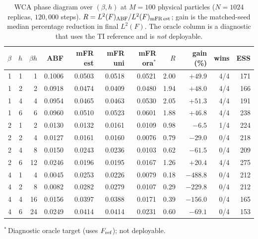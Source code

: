 \begin{table}[t]
\centering
\small
\caption{WCA phase diagram over $(\beta,h)$ at $M=100$ physical particles
($N=1024$ replicas, $120{,}000$ steps).
$R=L^2(F)_{\rm ABF}/L^2(F)_{\rm mFR\,est}$; gain is the matched-seed median
percentage reduction in final $L^2(F)$. The oracle column is a diagnostic that
uses the TI reference and is \emph{not} deployable.}
\label{tab:wca_phase_main}
\begin{tabular}{rrr rrrr rr rr}
\toprule
$\beta$ & $h$ & $\beta h$ & ABF & mFR est & mFR uni & mFR ora$^{*}$ & $R$ & gain (\%) & wins & ESS \\
\midrule
1 & 1 & 1 & 0.1006 & 0.0503 & 0.0518 & 0.0521 & 2.00 & $+49.9$ & 4/4 & 171 \\
1 & 2 & 2 & 0.0918 & 0.0474 & 0.0409 & 0.0480 & 1.94 & $+48.0$ & 4/4 & 166 \\
1 & 4 & 4 & 0.0954 & 0.0465 & 0.0463 & 0.0530 & 2.05 & $+51.3$ & 4/4 & 191 \\
1 & 6 & 6 & 0.0960 & 0.0510 & 0.0523 & 0.0601 & 1.88 & $+46.8$ & 4/4 & 238 \\
2 & 1 & 2 & 0.0130 & 0.0132 & 0.0161 & 0.0109 & 0.98 & $-6.5$ & 1/4 & 224 \\
2 & 2 & 4 & 0.0127 & 0.0161 & 0.0160 & 0.0076 & 0.79 & $-29.0$ & 0/4 & 218 \\
2 & 4 & 8 & 0.0150 & 0.0243 & 0.0236 & 0.0103 & 0.62 & $-61.5$ & 0/4 & 209 \\
2 & 6 & 12 & 0.0246 & 0.0196 & 0.0195 & 0.0167 & 1.26 & $+20.4$ & 4/4 & 275 \\
4 & 1 & 4 & 0.0045 & 0.0253 & 0.0226 & 0.0079 & 0.18 & $-488.8$ & 0/4 & 212 \\
4 & 2 & 8 & 0.0082 & 0.0282 & 0.0279 & 0.0107 & 0.29 & $-229.8$ & 0/4 & 212 \\
4 & 4 & 16 & 0.0156 & 0.0397 & 0.0388 & 0.0171 & 0.39 & $-156.0$ & 0/4 & 165 \\
4 & 6 & 24 & 0.0249 & 0.0414 & 0.0414 & 0.0231 & 0.60 & $-69.1$ & 0/4 & 153 \\
\bottomrule
\end{tabular}
\par\smallskip\footnotesize $^{*}$\,Diagnostic oracle target (uses $F_{\rm ref}$); not deployable.
\end{table}
